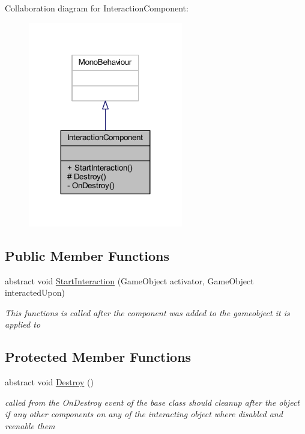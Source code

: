 Collaboration diagram for Interaction\+Component\+:\nopagebreak
\begin{figure}[H]
\begin{center}
\leavevmode
\includegraphics[width=191pt]{class_interaction_component__coll__graph}
\end{center}
\end{figure}
\subsection*{Public Member Functions}
\begin{DoxyCompactItemize}
\item 
abstract void \mbox{\hyperlink{class_interaction_component_a80d4c2288af453dd9611bbea092843e5}{Start\+Interaction}} (Game\+Object activator, Game\+Object interacted\+Upon)
\begin{DoxyCompactList}\small\item\em This functions is called after the component was added to the gameobject it is applied to \end{DoxyCompactList}\end{DoxyCompactItemize}
\subsection*{Protected Member Functions}
\begin{DoxyCompactItemize}
\item 
abstract void \mbox{\hyperlink{class_interaction_component_aa28f5c9f92b342c3d52f8b0b251fb4fa}{Destroy}} ()
\begin{DoxyCompactList}\small\item\em called from the On\+Destroy event of the base class should cleanup after the object if any other components on any of the interacting object where disabled and reenable them \end{DoxyCompactList}\end{DoxyCompactItemize}
